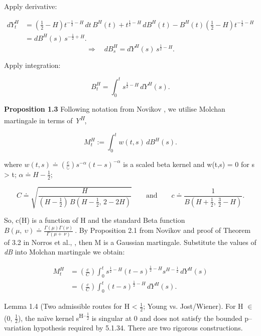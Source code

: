 \documentclass[12pt,a4paper]{report}
\numberwithin{equation}{section}
\begin{document}
Apply derivative:

\[
\begin{aligned}
dY_{t}^{H}
&= \left(\tfrac{1}{2}-H\right)t^{-\tfrac{1}{2}-H}\,dt\,B^{H}(t)
+ t^{\tfrac{1}{2}-H}\,dB^{H}(t)
- B^{H}(t)\left(\tfrac{1}{2}-H\right)t^{-\tfrac{1}{2}-H} \\
&= dB^{H}(s)\,s^{-\tfrac{1}{2}+H}.
\end{aligned}
\]
\[
\Rightarrow\quad dB_{s}^{H} = dY^{H}(s)\,s^{\tfrac{1}{2}-H}.
\]


Apply integration:

\begin{equation}\tag{5.1.36}\label{eq:5.1.36}
B_{t}^{H}=\int_{0}^{t}s^{\frac{1}{2}-H}\,dY^{H}(s).
\end{equation}

\textbf{Proposition 1.3} Following notation from Novikov \cite{novikov1999some_110}, we
utilise Molchan martingale \cite{molchan1969gaussian_111} in terms of
\emph{Y\textsuperscript{H}},

\[
M_t^{H} := \int_{0}^{t} w(t,s)\, dB^{H}(s).
\]



where
\(w(t,s) \doteq (\frac{c}{\complement})s^{- \alpha}{(t - s)}^{- \alpha}\)
is a scaled beta kernel and w(t,s) = 0 for s \textgreater{} t;
\(\alpha \doteq H - \frac{1}{2}\);


\[
C \doteq \sqrt{\frac{H}{\left(H-\frac{1}{2}\right)\,B\!\left(H-\frac{1}{2},\,2-2H\right)}}
\qquad\text{and}\qquad
c \doteq \frac{1}{B\!\left(H+\frac{1}{2},\,\frac{3}{2}-H\right)} .
\]

So, c(H) is a function of H and the standard Beta function
\(B(\mu,\ \upsilon) \doteq \frac{\Gamma(\mu)\Gamma(\nu)}{\Gamma(\mu + \ \nu)}\ \).
By Proposition 2.1 from Novikov \cite{novikov1999some_110} and proof of Theorem of 3.2 in
Norros et al., \cite{norros1999elementary_112}, then M is a Gaussian martingale. Substitute
the values of \emph{dB} into Molchan martingale we obtain:

\[
\begin{aligned}
M_t^{H}
&= \left(\frac{c}{C}\right)\int_{0}^{t} s^{\frac{1}{2}-H}(t-s)^{\frac{1}{2}-H}s^{H-\frac{1}{2}}\,dY^{H}(s) \\
&= \left(\frac{c}{C}\right)\int_{0}^{t} (t-s)^{\frac{1}{2}-H}\,dY^{H}(s).
\end{aligned}
\]

Lemma 1.4 (Two admissible routes for H \textless{} $\frac{1}{2}$; Young vs.
Jost/Wiener). For H $\in$ (0, $\frac{1}{2}$), the naïve kernel s\textsuperscript{H--$\frac{1}{2}$} is
singular at 0 and does not satisfy the bounded p--variation hypothesis
required by 5.1.34. There are two rigorous constructions.
\end{document}
